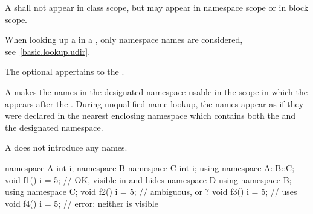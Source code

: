 \pnum
A  shall not appear in class scope, but may
appear in namespace scope or in block scope.
\begin{note}
When looking up a  in a
, only namespace names are considered,
see~\ref{basic.lookup.udir}.
\end{note}
The optional  appertains to the .

\pnum
\begin{note}
A  makes the names in the designated
namespace usable in the scope in which the
 appears after
the .
During unqualified name lookup, the names
appear as if they were declared in the nearest enclosing namespace which
contains both the  and the designated
namespace.
\end{note}

\pnum
\begin{note}
A  does not introduce any names.
\end{note}
\begin{example}
\begin{codeblock}
namespace A {
  int i;
  namespace B {
    namespace C {
      int i;
    }
    using namespace A::B::C;
    void f1() {
      i = 5;        // OK,  visible in  and hides 
    }
  }
  namespace D {
    using namespace B;
    using namespace C;
    void f2() {
      i = 5;        // ambiguous,  or ?
    }
  }
  void f3() {
    i = 5;          // uses 
  }
}
void f4() {
  i = 5;            // error: neither  is visible
}
\end{codeblock}
\end{example}

